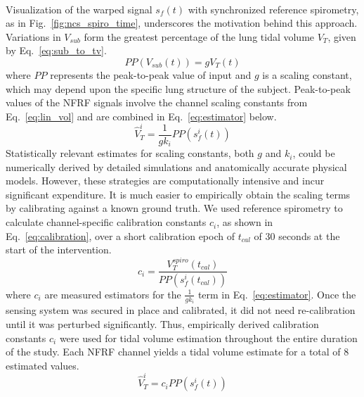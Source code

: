 \documentclass[journal]{IEEEtran}
\begin{document}
\\Visualization of the warped signal $s_f (t)$ with synchronized reference spirometry, as in Fig.~\ref{fig:ncs_spiro_time}, underscores the motivation behind this approach. Variations in $V_{sub}$ form the greatest percentage of the lung tidal volume $V_{T}$, given by Eq.~\ref{eq:sub_to_tv}. 
\begin{equation}
    PP(V_{sub} (t)) = g V_{T} (t)
    \label{eq:sub_to_tv}
\end{equation}
where $PP$ represents the peak-to-peak value of input and $g$ is a scaling constant, which may depend upon the specific lung structure of the subject. Peak-to-peak values of the NFRF signals involve the channel scaling constants from Eq.~\ref{eq:lin_vol} and are combined in Eq.~\ref{eq:estimator} below. 
\begin{equation}
    \hat{V}^{i}_{T} = \frac{1}{g k_i} PP(s_f^{i} (t))
    \label{eq:estimator}
\end{equation}
Statistically relevant estimates for scaling constants, both $g$ and $k_{i}$, could be numerically derived by detailed simulations and anatomically accurate physical models. However, these strategies are computationally intensive and incur significant expenditure. It is much easier to empirically obtain the scaling terms by calibrating against a known ground truth. We used reference spirometry to calculate channel-specific calibration constants $c_{i}$, as shown in Eq.~\ref{eq:calibration}, over a short calibration epoch of $t_{cal}$ of 30 seconds at the start of the intervention. 
\begin{equation}
        c_{i} = \frac{V^{spiro}_{T}(t_{cal})}{PP(s_f^{i} (t_{cal}))} 
    \label{eq:calibration}
\end{equation}
where $c_{i}$ are measured estimators for the $\frac{1}{gk_i}$ term in Eq.~\ref{eq:estimator}. Once the sensing system was secured in place and calibrated, it did not need re-calibration until it was perturbed significantly. Thus, empirically derived calibration constants $c_i$ were used for tidal volume estimation throughout the entire duration of the study. Each NFRF channel yields a tidal volume estimate for a total of 8 estimated values.
\begin{equation}
    \hat{V}^{i}_{T} = c_{i} PP(s_f^{i} (t))
    \label{eq:compute_tv}
\end{equation}
\end{document}
